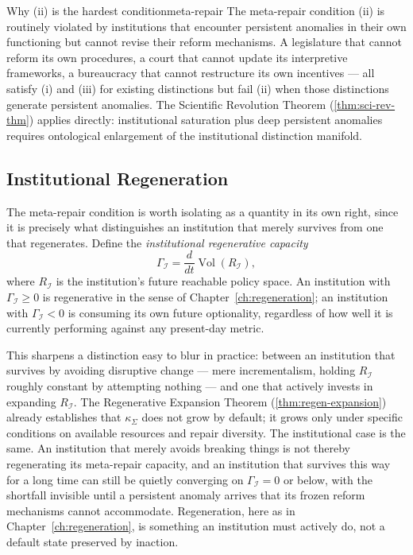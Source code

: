 \documentclass[12pt,twoside,openright]{book}
\newcommand{\Vol}{\operatorname{Vol}}
\begin{document}
\begin{remark}{Why (ii) is the hardest condition}{meta-repair}
  The meta-repair condition (ii) is routinely violated
  by institutions that encounter persistent anomalies
  in their own functioning but cannot revise their
  reform mechanisms. A legislature that cannot reform
  its own procedures, a court that cannot update its
  interpretive frameworks, a bureaucracy that cannot
  restructure its own incentives — all satisfy (i)
  and (iii) for existing distinctions but fail (ii)
  when those distinctions generate persistent anomalies.
  The Scientific Revolution Theorem
  (\cref{thm:sci-rev-thm}) applies directly:
  institutional saturation plus deep persistent
  anomalies requires ontological enlargement of the
  institutional distinction manifold.
\end{remark}

\subsection{Institutional Regeneration}
\label{sec:ch28-inst-regen}

The meta-repair condition is worth isolating as a quantity in
its own right, since it is precisely what distinguishes an
institution that merely survives from one that regenerates.
Define the \emph{institutional regenerative capacity}
\[
  \Gamma_\mathcal{I}
  = \frac{d}{dt} \Vol(R_\mathcal{I}),
\]
where $R_\mathcal{I}$ is the institution's future reachable
policy space. An institution with $\Gamma_\mathcal{I} \ge 0$
is regenerative in the sense of Chapter~\ref{ch:regeneration};
an institution with $\Gamma_\mathcal{I} < 0$ is consuming its
own future optionality, regardless of how well it is
currently performing against any present-day metric.

This sharpens a distinction easy to blur in practice: between
an institution that survives by avoiding disruptive change ---
mere incrementalism, holding $R_\mathcal{I}$ roughly constant
by attempting nothing --- and one that actively invests in
expanding $R_\mathcal{I}$. The Regenerative Expansion Theorem
(\cref{thm:regen-expansion}) already establishes that
$\kappa_\Sigma$ does not grow by default; it grows only under
specific conditions on available resources and repair
diversity. The institutional case is the same. An institution
that merely avoids breaking things is not thereby regenerating
its meta-repair capacity, and an institution that survives
this way for a long time can still be quietly converging on
$\Gamma_\mathcal{I} = 0$ or below, with the shortfall invisible
until a persistent anomaly arrives that its frozen reform
mechanisms cannot accommodate. Regeneration, here as in
Chapter~\ref{ch:regeneration}, is something an institution
must actively do, not a default state preserved by inaction.
\end{document}
